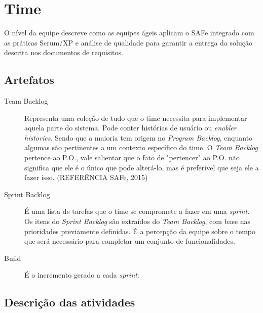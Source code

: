 \section{Time}
O nível da equipe descreve como as equipes ágeis aplicam o SAFe integrado com as práticas Scrum/XP e análise de qualidade para garantir a entrega da solução descrita nos documentos de requisitos.

\subsection{Artefatos}
\begin{description}
\item[Team Backlog] Representa uma coleção de tudo que o time necessita para implementar aquela parte do sistema. Pode conter histórias de usuário ou \textit{enabler histories}. Sendo que a maioria tem origem no \textit{Program Backlog}, enquanto algumas são pertinentes a um contexto específico do time. O \textit{Team Backlog} pertence ao P.O., vale salientar que o fato de "pertencer" ao P.O. não significa que ele é o único que pode alterá-lo, mas é preferível que seja ele a fazer isso. (REFERÊNCIA SAFe, 2015)
\item[Sprint Backlog] É uma lista de tarefas que o time se compromete a fazer em uma \textit{sprint}. Os itens do \textit{Sprint Backlog} são extraídos do \textit{Team Backlog}, com base nas prioridades previamente definidas. É a percepção da equipe sobre o tempo que será necessário para completar um conjunto de funcionalidades.
\item[Build] É o incremento gerado a cada \textit{sprint}.
\end{description}

\subsection{Descrição das atividades}
